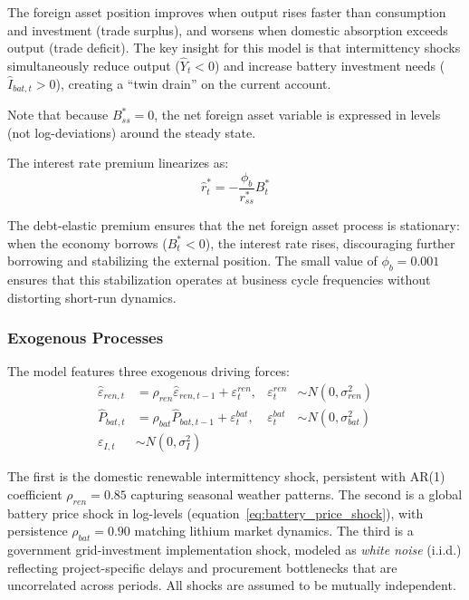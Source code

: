 \documentclass[12pt, a4paper]{article}
\begin{document}
The foreign asset position improves when output rises faster than consumption and investment (trade surplus), and worsens when domestic absorption exceeds output (trade deficit). The key insight for this model is that intermittency shocks simultaneously reduce output ($\hat{Y}_t < 0$) and increase battery investment needs ($\hat{I}_{bat,t} > 0$), creating a ``twin drain'' on the current account.

Note that because $B^*_{ss} = 0$, the net foreign asset variable is expressed in levels (not log-deviations) around the steady state.

The interest rate premium linearizes as:
\begin{equation}
\hat{r}^*_t = -\frac{\phi_b}{r^*_{ss}} B^*_t
\label{eq:premium_lin}
\end{equation}

The debt-elastic premium ensures that the net foreign asset process is stationary: when the economy borrows ($B^*_t < 0$), the interest rate rises, discouraging further borrowing and stabilizing the external position. The small value of $\phi_b = 0.001$ ensures that this stabilization operates at business cycle frequencies without distorting short-run dynamics.

\subsubsection{Exogenous Processes}

The model features three exogenous driving forces:
\begin{align}
\hat{\varepsilon}_{ren,t} &= \rho_{ren} \hat{\varepsilon}_{ren,t-1} + \varepsilon^{ren}_t, & \varepsilon^{ren}_t &\sim N(0, \sigma^2_{ren}) \label{eq:shock_ren} \\
\hat{P}_{bat,t} &= \rho_{bat} \hat{P}_{bat,t-1} + \varepsilon^{bat}_t, & \varepsilon^{bat}_t &\sim N(0, \sigma^2_{bat}) \label{eq:shock_bat} \\
\varepsilon_{I,t} &\sim N(0, \sigma^2_I) \label{eq:shock_gov}
\end{align}

The first is the domestic renewable intermittency shock, persistent with AR(1) coefficient $\rho_{ren} = 0.85$ capturing seasonal weather patterns. The second is a global battery price shock in log-levels (equation~\ref{eq:battery_price_shock}), with persistence $\rho_{bat} = 0.90$ matching lithium market dynamics. The third is a government grid-investment implementation shock, modeled as \textit{white noise} (i.i.d.) reflecting project-specific delays and procurement bottlenecks that are uncorrelated across periods. All shocks are assumed to be mutually independent.
\end{document}
